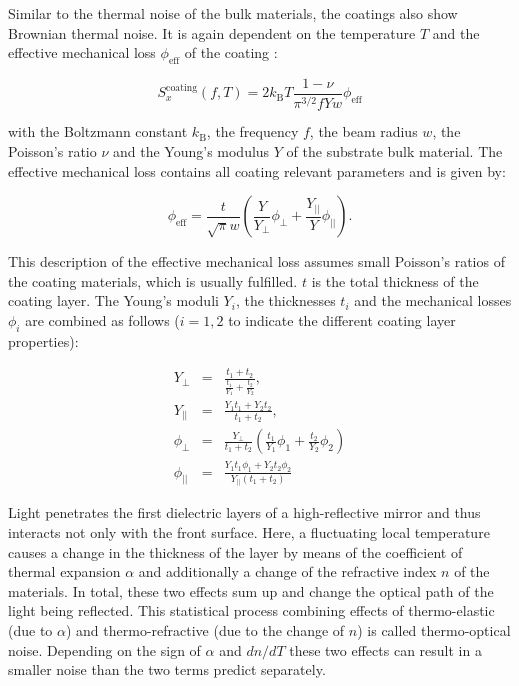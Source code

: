 Similar to the thermal noise of the bulk materials, the coatings also show Brownian thermal noise. It is again dependent on the temperature $T$ and the effective mechanical loss $\phi_\mathrm{eff}$ of the coating \cite{Harry2002,Harry2006}:

\begin{equation}
S_x^\mathrm{coating}(f,T) = 2k_\mathrm{B}T\frac{1-\nu}{\pi^{3/2}fYw}\phi_\mathrm{eff}
\label{eq:coat_Brownian}
\end{equation}

with the Boltzmann constant $k_\mathrm{B}$, the frequency $f$, the beam radius $w$, the Poisson's ratio $\nu$ and the Young's modulus $Y$ of the substrate bulk material. The effective mechanical loss contains all coating relevant parameters and is given by:

\begin{equation}
\phi_\mathrm{eff} = \frac{t}{\sqrt{\pi}w}\left(\frac{Y}{Y_\bot}\phi_\bot + \frac{Y_{||}}{Y}\phi_{||} \right).
\label{eq:coat_eff_loss}
\end{equation}

This description of the effective mechanical loss assumes small Poisson's ratios of the coating materials, which is usually fulfilled. $t$ is the total thickness of the coating layer. The Young's moduli $Y_i$, the thicknesses $t_i$ and the mechanical losses $\phi_i$ are combined as follows ($i=1,2$ to indicate the different coating layer properties):

\begin{eqnarray}
Y_\bot & = & \frac{t_1+t_2}{\frac{t_1}{Y_1}+\frac{t_2}{Y_2}}, \\
Y_{||} & = & \frac{Y_1t_1 + Y_2t_2}{t_1+t_2}, \\ 
\phi_\bot & = & \frac{Y_\bot}{t_1+t_2} \left(\frac{t_1}{Y_1}\phi_1+\frac{t_2}{Y_2}\phi_2 \right) \\
\phi_{||} & = & \frac{Y_1t_1\phi_1 + Y_2t_2\phi_2}{Y_{||}\left(t_1+t_2\right)}
\label{eq:coat_aniso_param}
\end{eqnarray}

Light penetrates the first  dielectric layers of a high-reflective mirror and thus interacts not only with the front surface. Here, a fluctuating local temperature causes a change in the thickness of the layer by means of the coefficient of thermal expansion $\alpha$ and additionally a change of the refractive index $n$ of the materials. In total, these two effects sum up and change the optical path of the light being reflected. This statistical process combining effects of thermo-elastic (due to $\alpha$) and thermo-refractive (due to the change of $n$) is called thermo-optical noise. Depending on the sign of $\alpha$ and $dn/dT$ these two effects can result in a smaller noise than the two terms predict separately.

